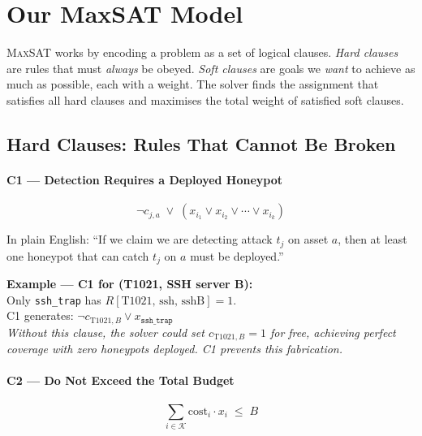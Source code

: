 \documentclass[journal]{IEEEtran}
\newcommand{\maxsat}{\textsc{MaxSAT}}
\newcommand{\calK}{\mathcal{K}}
\begin{document}
\section{Our MaxSAT Model}
\label{sec:formulation}

\maxsat{} works by encoding a problem as a set of logical
clauses.
\emph{Hard clauses} are rules that must \emph{always} be
obeyed.
\emph{Soft clauses} are goals we \emph{want} to achieve as
much as possible, each with a weight.
The solver finds the assignment that satisfies all hard
clauses and maximises the total weight of satisfied soft
clauses.

\subsection{Hard Clauses: Rules That Cannot Be Broken}

\paragraph{C1 --- Detection Requires a Deployed Honeypot}
\begin{equation}
  \neg c_{j,a} \;\vee\;
  (x_{i_1} \vee x_{i_2} \vee \cdots \vee x_{i_k})
\end{equation}

In plain English: ``If we claim we are detecting attack
$t_j$ on asset $a$, then at least one honeypot that can
catch $t_j$ on $a$ must be deployed.''

\begin{examplebox}
\textbf{Example --- C1 for (T1021, SSH server B):}\\[3pt]
Only \texttt{ssh\_trap} has $R[\text{T1021, ssh, sshB}]=1$.\\
C1 generates: $\neg c_{\text{T1021},B}
\vee x_{\texttt{ssh\_trap}}$\\[3pt]
\textit{Without this clause, the solver could set
$c_{\text{T1021},B}=1$ for free, achieving perfect coverage
with zero honeypots deployed.
C1 prevents this fabrication.}
\end{examplebox}

\paragraph{C2 --- Do Not Exceed the Total Budget}
\begin{equation}
  \sum_{i \in \calK} \mathrm{cost}_i \cdot x_i \;\leq\; B
\end{equation}
\end{document}
